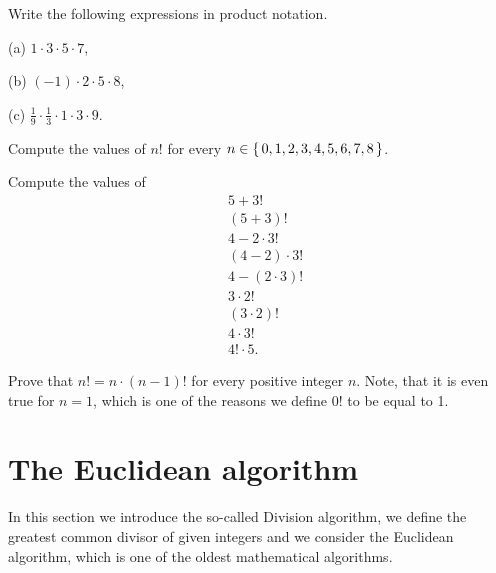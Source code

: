 \begin{exercise}\label{intro-ex-12}
Write the following expressions in product notation.

(a) $1\cdot 3\cdot 5\cdot 7$,

(b) $(-1)\cdot 2\cdot 5\cdot 8$,

(c) $\frac{1}{9}\cdot\frac{1}{3}\cdot 1\cdot 3\cdot 9$.
\end{exercise}

\begin{exercise}\label{ex:factorial1}
Compute the values of $n!$ for every $n \in \left\{\,0, 1, 2, 3, 4, 5, 6, 7, 8\,\right\}$. 
\end{exercise}

\begin{exercise}\label{ex:factorial2}
Compute the values of 
\begin{align*}
& 5+3! \\
& (5+3)! \\
& 4-2\cdot 3! \\
& (4-2)\cdot 3! \\
& 4 - (2 \cdot 3)! \\
& 3 \cdot 2! \\
& (3 \cdot 2)! \\
& 4 \cdot 3! \\
& 4! \cdot 5. 
\end{align*}
\end{exercise}

\begin{exercise}\label{ex:factorial3}
Prove that $n! = n \cdot (n-1)!$ for every positive integer $n$. 
Note, that it is even true for $n=1$, 
which is one of the reasons we define $0!$ to be equal to 1. 
\end{exercise}





\section{The Euclidean algorithm}\label{Euc}
In this section we introduce the so-called Division algorithm, we define the greatest common divisor of given integers and we consider
the Euclidean algorithm, which is one of the oldest mathematical algorithms.

